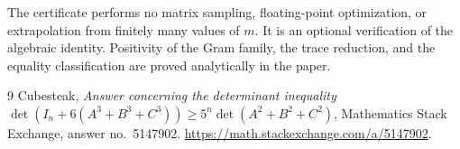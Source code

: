 \documentclass[11pt]{article}
\newcommand{\Id}{I_n}
\begin{document}
The certificate performs no matrix sampling, floating-point
optimization, or extrapolation from finitely many values of \(m\).
It is an optional verification of the algebraic identity.
Positivity of the Gram family, the trace reduction, and the equality
classification are proved analytically in the paper.

\begin{thebibliography}{9}
Cubesteak,
\emph{Answer concerning the determinant inequality
\(\det(\Id+6(A^3+B^3+C^3))\ge5^n\det(A^2+B^2+C^2)\)},
Mathematics Stack Exchange, answer no.~5147902.
\url{https://math.stackexchange.com/a/5147902}.
\end{thebibliography}
\end{document}
